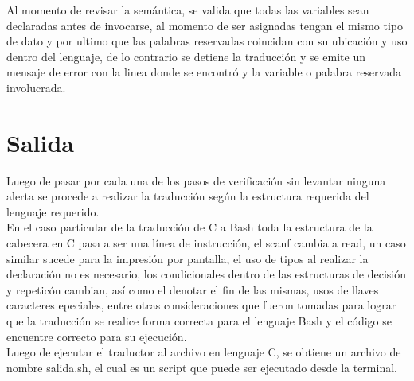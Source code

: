 \documentclass[aspectratio=169]{article}
\begin{document}
	Al momento de revisar la semántica, se valida que todas las variables sean declaradas antes de invocarse,
	al momento de ser asignadas tengan el mismo tipo de dato y por ultimo que las palabras reservadas coincidan
	con su ubicación y uso dentro del lenguaje, de lo contrario se detiene la traducción y se emite un mensaje
	de error con la linea donde se encontró y la variable o palabra reservada involucrada.

\section{Salida}

	Luego de pasar por cada una de los pasos de verificación sin levantar ninguna alerta se procede a 
	realizar la traducción según la estructura requerida del lenguaje requerido.\\
	
	En el caso particular de la traducci\'on de C a Bash toda la estructura de la cabecera en C pasa a ser una
	línea de instrucci\'on, el scanf  cambia a read, un caso similar sucede para la impresi\'on
	por pantalla,  el uso de tipos al realizar la declaraci\'on no es necesario, los condicionales dentro de 
	las estructuras de decisi\'on y repetic\'on cambian, así como el denotar el fin de las mismas, usos de 
	llaves caracteres epeciales, entre otras consideraciones que fueron tomadas para lograr que la traducci\'on 
	se realice forma correcta para el lenguaje Bash y el c\'odigo se encuentre correcto para su ejecuci\'on.\\ 
	
	Luego de ejecutar el traductor al archivo en lenguaje C, se obtiene un archivo de nombre salida.sh, el cual es 
	un script que puede ser ejecutado desde la terminal.
\end{document}
